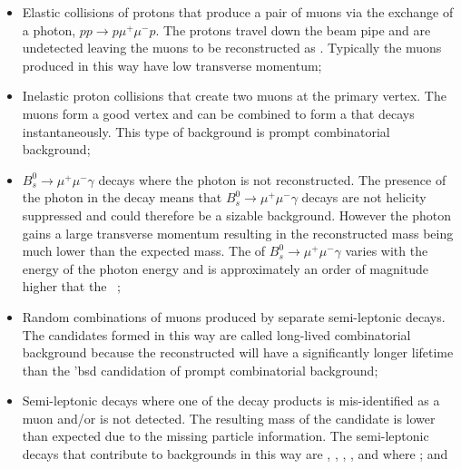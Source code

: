 \begin{itemize}
\item Elastic collisions of protons that produce a pair of muons via the exchange of a photon, $pp \to p \mu^{+} \mu^{-} p$. The protons travel down the beam pipe and are undetected leaving the muons to be reconstructed as \bmumu. Typically the muons produced in this way have low transverse momentum; %
\item Inelastic proton collisions that create two muons at the primary vertex. The muons form a good vertex and can be combined to form a \bsd that decays instantaneously. This type of background is prompt combinatorial background;
\item $B_{s}^{0}\to\mu^{+}\mu^{-}\gamma$ decays where the photon is not reconstructed. The presence of the photon in the decay means that $B_{s}^{0}\to\mu^{+}\mu^{-}\gamma$ decays are not helicity suppressed and could therefore be a sizable background. However the photon gains a large transverse momentum resulting in the reconstructed \bsd mass being much lower than the expected \bs mass. The \BF of $B_{s}^{0}\to\mu^{+}\mu^{-}\gamma$ varies with the energy of the photon energy and is approximately an order of magnitude higher that the \bsmumu \BF~\cite{Bobeth:2013uxa,Melikhov:2004mk,Aditya:2012im}; 
\item Random combinations of muons produced by separate semi-leptonic decays. The \bmumu candidates formed in this way are called long-lived combinatorial background because the reconstructed \bsd will have a significantly longer lifetime than the 'bsd candidation of prompt combinatorial background; %
\item Semi-leptonic decays where one of the decay products is mis-identified as a muon and/or is not detected. The resulting mass of the \bsd candidate is lower than expected due to the missing particle information. The semi-leptonic decays that contribute to \bmumu backgrounds in this way are \bdpimunu, \bsKmunu, \lambdab, \bupimumu, \bdpimumu and \bcjpsimunu where \jpsimumu; and %

\end{itemize}
